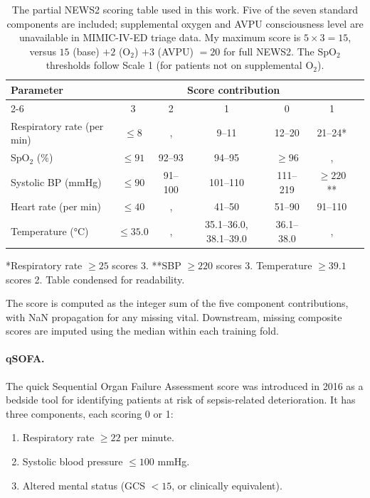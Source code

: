\begin{table}[htbp]
 \centering
 \caption[NEWS2 scoring table as implemented]{The partial NEWS2 scoring table used in this work. Five of the seven standard components are included; supplemental oxygen and AVPU consciousness level are unavailable in MIMIC-IV-ED triage data. My maximum score is $5 \times 3 = 15$, versus $15$ (base) $+ 2$ (O$_2$) $+ 3$ (AVPU) $= 20$ for full NEWS2. The SpO$_2$ thresholds follow Scale 1 (for patients not on supplemental O$_2$).}
 \label{tab:news2-scoring}
 \small
 \begin{tabular}{lcccccc}
 \toprule
 Parameter & \multicolumn{5}{c}{Score contribution} \\
 \cmidrule(lr){2-6}
 & 3 & 2 & 1 & 0 & 1 \\
 \midrule
 Respiratory rate (per min) & $\leq 8$ &, & 9--11 & 12--20 & 21--24* \\
 SpO$_2$ (\%) & $\leq 91$ & 92--93 & 94--95 & $\geq 96$ &, \\
 Systolic BP (mmHg) & $\leq 90$ & 91--100 & 101--110 & 111--219 & $\geq 220$** \\
 Heart rate (per min) & $\leq 40$ &, & 41--50 & 51--90 & 91--110 \\
 Temperature (°C) & $\leq 35.0$ &, & 35.1--36.0, 38.1--39.0 & 36.1--38.0 &, \\
 \bottomrule
 \end{tabular}
 \begin{flushleft}\small
 *Respiratory rate $\geq 25$ scores 3. **SBP $\geq 220$ scores 3. Temperature $\geq 39.1$ scores 2. Table condensed for readability.
 \end{flushleft}
\end{table}

The score is computed as the integer sum of the five component contributions, with NaN propagation for any missing vital. Downstream, missing composite scores are imputed using the median within each training fold.

\paragraph{qSOFA.} The quick Sequential Organ Failure Assessment score \citep{singer2016sepsis3} was introduced in 2016 as a bedside tool for identifying patients at risk of sepsis-related deterioration. It has three components, each scoring 0 or 1:

\begin{enumerate}
 \item Respiratory rate $\geq 22$ per minute.
 \item Systolic blood pressure $\leq 100$ mmHg.
 \item Altered mental status (GCS $< 15$, or clinically equivalent).
\end{enumerate}

